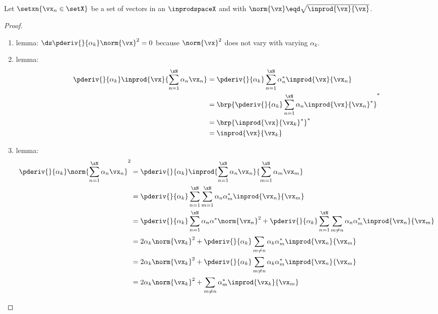 \begin{theorem}
\label{thm:bat_frame}
Let $\setxn{\vx_n\in\setX}$ be a set of vectors in an   $\inprodspaceX$ and with
$\norm{\vx}\eqd\sqrt{\inprod{\vx}{\vx}}$.
\end{theorem}
\begin{proof}
\begin{enumerate}
  \item lemma: \label{ilem:batframe_normvx}
        $\ds\pderiv{}{\alpha_k} \norm{\vx}^2 = 0$ because $\norm{\vx}^2$ does not vary with varying $\alpha_k$.

  \item lemma: \label{ilem:batframe_inprod}
    \begin{align*}
      \pderiv{}{\alpha_k}\inprod{\vx}{\sum_{n=1}^\xN \alpha_{n} \vx_n}
        &= \pderiv{}{\alpha_k}\sum_{n=1}^\xN \alpha^\ast_{n}\inprod{\vx}{\vx_n}
      \\&= \brp{\pderiv{}{\alpha_k}\sum_{n=1}^\xN \alpha_{n}\inprod{\vx}{\vx_n}^\ast}^\ast
      \\&= \brp{\inprod{\vx}{\vx_k}^\ast}^\ast
      \\&= \inprod{\vx}{\vx_k}
    \end{align*}

  \item  lemma: \label{ilem:batframe_norm}
    \begin{align*}
      \pderiv{}{\alpha_k} \norm{\sum_{n=1}^\xN \alpha_{n} \vx_n}^2
        &= \pderiv{}{\alpha_k} \inprod{\sum_{n=1}^\xN \alpha_{n} \vx_n}{\sum_{m=1}^\xN \alpha_{m} \vx_m}
      \\&= \pderiv{}{\alpha_k} \sum_{n=1}^\xN \sum_{m=1}^\xN \alpha_{n}\alpha^\ast_{m}\inprod{\vx_n}{\vx_m}
      \\&= \pderiv{}{\alpha_k} \sum_{n=1}^\xN \alpha_{n}\alpha^\ast\norm{\vx_n}^2
         + \pderiv{}{\alpha_k} \sum_{n=1}^\xN \sum_{m\neq n} \alpha_{n}\alpha^\ast_{m} \inprod{\vx_n}{\vx_m}
      \\&= 2\alpha_{k}\norm{\vx_k}^2
         + \pderiv{}{\alpha_k} \sum_{m\neq n} \alpha_{k}\alpha^\ast_{m}\inprod{\vx_n}{\vx_m}
      \\&= 2\alpha_{k}\norm{\vx_k}^2
         + \pderiv{}{\alpha_k} \sum_{m\neq n} \alpha_{k}\alpha^\ast_{m}\inprod{\vx_n}{\vx_m}
      \\&= 2\alpha_{k} \norm{\vx_k}^2
         + \sum_{m\neq n} \alpha^\ast_{m}\inprod{\vx_k}{\vx_m}
    \end{align*}


\end{enumerate}
\end{proof}
